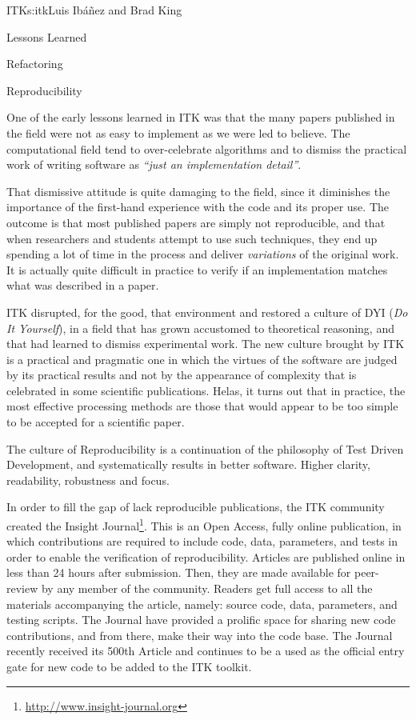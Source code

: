 \begin{aosachapter}{ITK}{s:itk}{Luis Ib\'{a}\~{n}ez and Brad King}
\begin{aosasect1}{Lessons Learned}
\begin{aosasect2}{Refactoring}
\end{aosasect2}

\begin{aosasect2}{Reproducibility}

One of the early lessons learned in ITK was that the many papers published in
the field were not as easy to implement as we were led to believe.  The
computational field tend to over-celebrate algorithms and to dismiss the
practical work of writing software as \emph{``just an implementation detail''}.

That dismissive attitude is quite damaging to the field, since it diminishes the
importance of the first-hand experience with the code and its proper use. The
outcome is that most published papers are simply not reproducible, and that
when researchers and students attempt to use such techniques, they end up
spending a lot of time in the process and deliver \emph{variations} of the
original work. It is actually quite difficult in practice to verify if an
implementation matches what was described in a paper.

ITK disrupted, for the good, that environment and restored a culture of DYI
(\emph{Do It Yourself}), in a field that has grown accustomed to theoretical
reasoning, and that had learned to dismiss experimental work. The new culture
brought by ITK is a practical and pragmatic one in which the virtues of the
software are judged by its practical results and not by the appearance of
complexity that is celebrated in some scientific publications. Helas, it turns
out that in practice, the most effective processing methods are those that
would appear to be too simple to be accepted for a scientific paper.

The culture of Reproducibility is a continuation of the philosophy of Test
Driven Development, and systematically results in better software. Higher
clarity, readability, robustness and focus.

In order to fill the gap of lack reproducible publications, the ITK community
created the Insight Journal\footnote{\url{http://www.insight-journal.org}}.
This is an Open Access, fully online publication, in which contributions are
required to include code, data, parameters, and tests in order to enable the
verification of reproducibility. Articles are published online in less than 24
hours after submission. Then, they are made available for peer-review by any
member of the community. Readers get full access to all the materials
accompanying the article, namely: source code, data, parameters, and testing
scripts. The Journal have provided a prolific space for sharing new code
contributions, and from there, make their way into the code base. The Journal
recently received its 500th Article and continues to be a used as the official
entry gate for new code to be added to the ITK toolkit.
\end{aosasect2}

\end{aosasect1}

\end{aosachapter}
